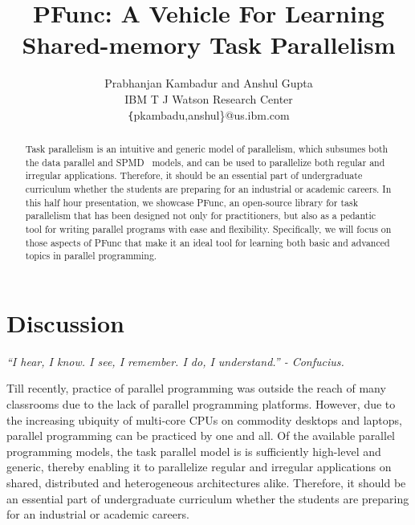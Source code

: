 \documentclass[9pt,twocolumn,letter]{article}
\begin{document}
\title{PFunc: A Vehicle For Learning Shared-memory Task Parallelism}

\author{
Prabhanjan Kambadur and Anshul Gupta\\ 
IBM T J Watson Research Center\\
{\texttt \{pkambadu,anshul\}@us.ibm.com}
}

\date{}

\maketitle


\begin{abstract} 
Task parallelism is an intuitive and generic model of parallelism, which
subsumes both the data parallel and SPMD~\cite{darema2001} models, and can be
used to parallelize both regular and irregular applications.
%
Therefore, it should be an essential part of undergraduate curriculum whether
the students are preparing for an industrial or academic careers.
%
In this half hour presentation, we showcase PFunc, an open-source library for
task parallelism that has been designed not only for practitioners, but also as
a pedantic tool for writing parallel programs with ease and flexibility.
%
Specifically, we will focus on those aspects of PFunc that make it an ideal 
tool for learning both basic and advanced topics in parallel programming.
\end{abstract}

\section{Discussion}
\begin{center}
\small{\textit{``I hear, I know. I see, I remember. I do, I understand.'' -
Confucius.}}
\end{center}
%
Till recently, practice of parallel programming was outside the reach of many 
classrooms due to the lack of parallel programming platforms.
% 
However, due to the increasing ubiquity of multi-core CPUs on commodity
desktops and laptops, parallel programming can be practiced by one and all.
Of the available parallel programming models, the task parallel model is is
sufficiently high-level and generic, thereby enabling it to parallelize regular
and irregular applications on shared, distributed and heterogeneous
architectures alike.  
%
Therefore, it should be an essential part of undergraduate curriculum whether
the students are preparing for an industrial or academic careers.
\end{document}
